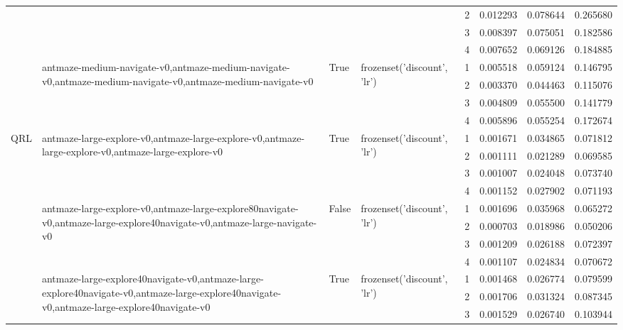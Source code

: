 \begin{tabular}{lllllrrr}
 &  &  &  & 2 & 0.012293 & 0.078644 & 0.265680 \\
 &  &  &  & 3 & 0.008397 & 0.075051 & 0.182586 \\
 &  &  &  & 4 & 0.007652 & 0.069126 & 0.184885 \\
\cline{2-8} \cline{3-8} \cline{4-8}
 & \multirow[t]{4}{*}{antmaze-medium-navigate-v0,antmaze-medium-navigate-v0,antmaze-medium-navigate-v0,antmaze-medium-navigate-v0} & \multirow[t]{4}{*}{True} & \multirow[t]{4}{*}{frozenset({'discount', 'lr'})} & 1 & 0.005518 & 0.059124 & 0.146795 \\
 &  &  &  & 2 & 0.003370 & 0.044463 & 0.115076 \\
 &  &  &  & 3 & 0.004809 & 0.055500 & 0.141779 \\
 &  &  &  & 4 & 0.005896 & 0.055254 & 0.172674 \\
\cline{1-8} \cline{2-8} \cline{3-8} \cline{4-8}
\multirow[t]{40}{*}{QRL} & \multirow[t]{4}{*}{antmaze-large-explore-v0,antmaze-large-explore-v0,antmaze-large-explore-v0,antmaze-large-explore-v0} & \multirow[t]{4}{*}{True} & \multirow[t]{4}{*}{frozenset({'discount', 'lr'})} & 1 & 0.001671 & 0.034865 & 0.071812 \\
 &  &  &  & 2 & 0.001111 & 0.021289 & 0.069585 \\
 &  &  &  & 3 & 0.001007 & 0.024048 & 0.073740 \\
 &  &  &  & 4 & 0.001152 & 0.027902 & 0.071193 \\
\cline{2-8} \cline{3-8} \cline{4-8}
 & \multirow[t]{4}{*}{antmaze-large-explore-v0,antmaze-large-explore80navigate-v0,antmaze-large-explore40navigate-v0,antmaze-large-navigate-v0} & \multirow[t]{4}{*}{False} & \multirow[t]{4}{*}{frozenset({'discount', 'lr'})} & 1 & 0.001696 & 0.035968 & 0.065272 \\
 &  &  &  & 2 & 0.000703 & 0.018986 & 0.050206 \\
 &  &  &  & 3 & 0.001209 & 0.026188 & 0.072397 \\
 &  &  &  & 4 & 0.001107 & 0.024834 & 0.070672 \\
\cline{2-8} \cline{3-8} \cline{4-8}
 & \multirow[t]{4}{*}{antmaze-large-explore40navigate-v0,antmaze-large-explore40navigate-v0,antmaze-large-explore40navigate-v0,antmaze-large-explore40navigate-v0} & \multirow[t]{4}{*}{True} & \multirow[t]{4}{*}{frozenset({'discount', 'lr'})} & 1 & 0.001468 & 0.026774 & 0.079599 \\
 &  &  &  & 2 & 0.001706 & 0.031324 & 0.087345 \\
 &  &  &  & 3 & 0.001529 & 0.026740 & 0.103944 \\

\end{tabular}
